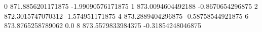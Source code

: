 0 871.8856201171875 -1.99090576171875
1 873.0094604492188 -0.8670654296875
2 872.3015747070312 -1.574951171875
4 873.2889404296875 -0.58758544921875
6 873.8765258789062 0.0
8 873.5579833984375 -0.31854248046875
